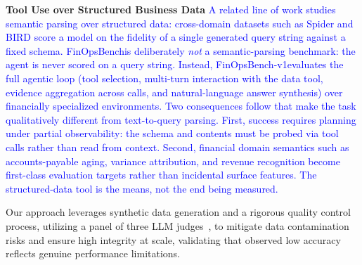 \documentclass[11pt]{article}
\newcommand{\edit}[1]{\textcolor{blue}{#1}}
\newcommand{\editN}[1]{\textcolor{editgreen}{#1}}
\newcommand{\datasetname}{FinOpsBench}\xspace
\newcommand{\synthsubset}{FinOpsBench-v1}\xspace
\begin{document}
\noindent \textbf{Tool Use over Structured Business Data}
\edit{A related line of work studies semantic parsing over structured data: cross-domain datasets such as Spider \citep{spider} and BIRD
\citep{li2024can} score a model on the fidelity of a single generated query string against a fixed schema. \datasetname is
deliberately \emph{not} a semantic-parsing benchmark: the agent is never scored on a query string. Instead, \synthsubset evaluates
the full agentic loop (tool selection, multi-turn interaction with the data tool, evidence aggregation across calls, and natural-language
answer synthesis) over financially specialized environments. Two consequences follow that make the task qualitatively different from
text-to-query parsing. First, success requires planning under partial observability: the schema and contents must be probed via tool calls
rather than read from context. Second, financial domain semantics such as accounts-payable aging, variance attribution, and revenue
recognition become first-class evaluation targets rather than incidental surface features. The structured-data tool is the means, not
the end being measured.}

Our approach leverages synthetic data generation and a rigorous quality control process, utilizing a
\editN{panel of three LLM judges~\citep{zheng2023judging,verga2024replacing}, to}
mitigate data contamination risks and ensure high integrity at scale, validating that observed low accuracy reflects genuine
performance limitations.

\end{document}

